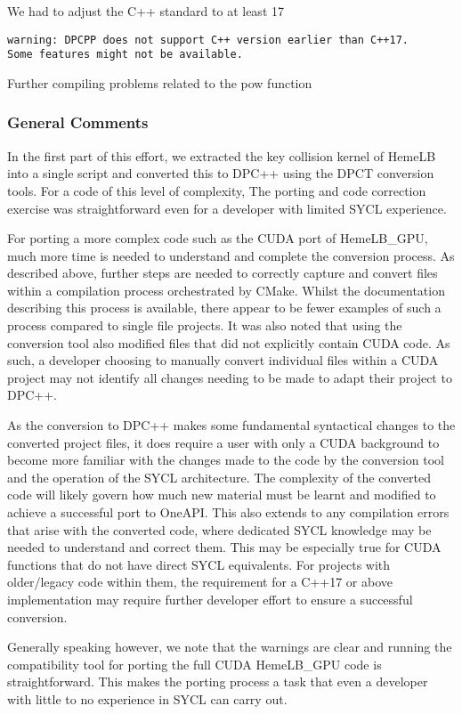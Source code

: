 \documentclass[../main]{subfiles}
\begin{document}
We had to adjust the C++ standard to at least 17
\begin{verbatim}
warning: DPCPP does not support C++ version earlier than C++17. 
Some features might not be available.
\end{verbatim}

Further compiling problems related to the pow function


\subsubsection{General Comments}
In the first part of this effort, we extracted the key collision kernel of HemeLB into a single script and converted this to DPC++ using the  DPCT conversion tools. For a code of this level of complexity, The porting and code correction exercise was straightforward even for a developer with limited SYCL experience.

For porting a more complex code such as the CUDA port of HemeLB\_GPU, much more time is needed to understand and complete the conversion process. As described above, further steps are needed to correctly capture and convert files within a compilation process orchestrated by CMake. Whilst the documentation describing this process is available, there appear to be fewer examples of such a process compared to single file projects. It was also noted that using the conversion tool also modified files that did not explicitly contain CUDA code. As such, a developer choosing to manually convert individual files within a CUDA project may not identify all changes needing to be made to adapt their project to DPC++.

As the conversion to DPC++ makes some fundamental syntactical changes to the converted project files, it does require a user with only a CUDA background to become more familiar with the changes made to the code by the conversion tool and the operation of the SYCL architecture. The complexity of the converted code will likely govern how much new material must be learnt and modified to achieve a successful port to OneAPI. This also extends to any compilation errors that arise with the converted code, where dedicated SYCL knowledge may be needed to understand and correct them. This may be especially true for CUDA functions that do not have direct SYCL equivalents. For projects with older/legacy code within them, the requirement for a C++17 or above implementation may require further developer effort to ensure a successful conversion.

Generally speaking however, we note that the warnings are clear and running the  compatibility tool for porting the full CUDA HemeLB\_GPU code is straightforward. This makes the porting process a task that even a developer with little to no experience in SYCL can carry out.  
\end{document}
